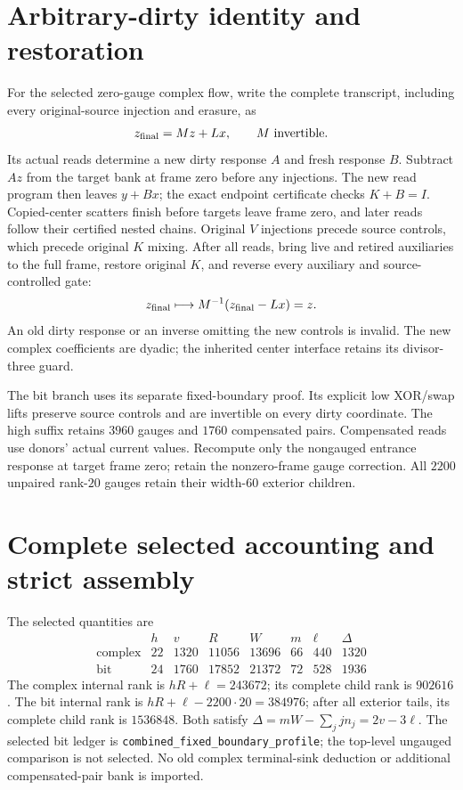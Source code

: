 \documentclass[11pt]{article}
\begin{document}
\section{Arbitrary-dirty identity and restoration}
For the selected zero-gauge complex flow, write the complete transcript,
including every original-source injection and erasure, as
\[
 z_{\rm final}=Mz+Lx,\qquad M\text{ invertible}.
\]
Its actual reads determine a new dirty response $A$ and fresh response $B$.
Subtract $Az$ from the target bank at frame zero before any injections.
The new read program then leaves $y+Bx$; the exact endpoint certificate
checks $K+B=I$. Copied-center scatters finish before targets leave frame
zero, and later reads follow their certified nested chains. Original
$V$ injections precede source controls, which precede original $K$ mixing.
After all reads, bring live and retired auxiliaries to the full frame,
restore original $K$, and reverse every auxiliary and source-controlled gate:
\[
 z_{\rm final}\longmapsto M^{-1}(z_{\rm final}-Lx)=z.
\]
An old dirty response or an inverse omitting the new controls is invalid.
The new complex coefficients are dyadic; the inherited center interface
retains its divisor-three guard.

The bit branch uses its separate fixed-boundary proof. Its explicit low
XOR/swap lifts preserve source controls and are invertible on every dirty
coordinate. The high suffix retains $3960$ gauges and $1760$ compensated
pairs. Compensated reads use donors' actual current values. Recompute
only the nongauged entrance response at target frame zero; retain the
nonzero-frame gauge correction. All $2200$ unpaired rank-$20$ gauges
retain their width-$60$ exterior children.

\section{Complete selected accounting and strict assembly}
The selected quantities are
\[
\begin{array}{c|rrrrrrr}
 &h&v&R&W&m&\ell&\Delta\\\hline
\text{complex}&22&1320&11056&13696&66&440&1320\\
\text{bit}&24&1760&17852&21372&72&528&1936
\end{array}
\]
The complex internal rank is $hR+\ell=243672$; its complete child
rank is $902616$. The bit internal rank is
$hR+\ell-2200\cdot20=384976$; after all exterior tails, its complete
child rank is $1536848$. Both satisfy
$\Delta=mW-\sum_j j n_j=2v-3\ell$.
The selected bit ledger is \texttt{combined\_fixed\_boundary\_profile};
the top-level ungauged comparison is not selected. No old complex
terminal-sink deduction or additional compensated-pair bank is imported.
\end{document}
